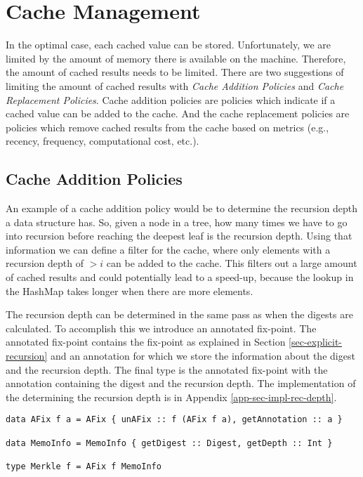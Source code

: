 \section{Cache Management}
\label{sec-cache-manage}

In the optimal case, each cached value can be stored. Unfortunately, we are limited by the amount of memory there is available on the machine. Therefore, the amount of cached results needs to be limited. There are two suggestions of limiting the amount of cached results with \textit{Cache Addition Policies} and \textit{Cache Replacement Policies}. Cache addition policies are policies which indicate if a cached value can be added to the cache. And the cache replacement policies are policies which remove cached results from the cache based on metrics (e.g., recency, frequency, computational cost, etc.). 

\subsection{Cache Addition Policies}

An example of a cache addition policy would be to determine the recursion depth a data structure has. So, given a node in a tree, how many times we have to go into recursion before reaching the deepest leaf is the recursion depth. Using that information we can define a filter for the cache, where only elements with a recursion depth of $>i$ can be added to the cache. This filters out a large amount of cached results and could potentially lead to a speed-up, because the lookup in the HashMap takes longer when there are more elements. 

\pagebreak
The recursion depth can be determined in the same pass as when the digests are calculated. To accomplish this we introduce an annotated fix-point. The annotated fix-point contains the fix-point as explained in Section \ref*{sec-explicit-recursion} and an annotation for which we store the information about the digest and the recursion depth. The final  type is the annotated fix-point with the annotation containing the digest and the recursion depth. The implementation of the determining the recursion depth is in Appendix \ref*{app-sec-impl-rec-depth}.

\begin{verbatim}
data AFix f a = AFix { unAFix :: f (AFix f a), getAnnotation :: a }

data MemoInfo = MemoInfo { getDigest :: Digest, getDepth :: Int }

type Merkle f = AFix f MemoInfo
\end{verbatim}

